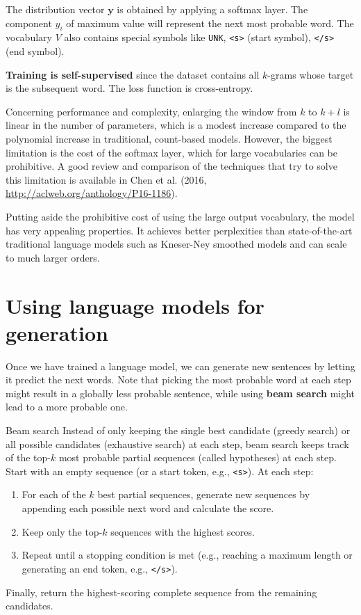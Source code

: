 The distribution vector $\mathbf{y}$ is obtained by applying a softmax layer. The component $y_{i}$ of maximum value will represent the next most probable word. The vocabulary $V$ also contains special symbols like \texttt{UNK}, \texttt{<s>} (start symbol), \texttt{</s>} (end symbol).

\textbf{Training is self-supervised} since the dataset contains all $k$-grams whose target is the subsequent word. The loss function is cross-entropy.

Concerning performance and complexity, enlarging the window from $k$ to $k+l$ is linear in the number of parameters, which is a modest increase compared to the polynomial increase in traditional, count-based models. However, the biggest limitation is the cost of the softmax layer, which for large vocabularies can be prohibitive. A good review and comparison of the techniques that try to solve this limitation is available in Chen et al. (2016, \url{http://aclweb.org/anthology/P16-1186}).

Putting aside the prohibitive cost of using the large output vocabulary, the model has very appealing properties. It achieves better perplexities than state-of-the-art traditional language models such as Kneser-Ney smoothed models and can scale to much larger orders.

\section{Using language models for generation}
Once we have trained a language model, we can generate new sentences by letting it predict the next words. Note that picking the most probable word at each step might result in a globally less probable sentence, while using \textbf{beam search} might lead to a more probable one.

\begin{observation}{Beam search}
Instead of only keeping the single best candidate (greedy search) or all possible candidates (exhaustive search) at each step, beam search keeps track of the top-$k$ most probable partial sequences (called hypotheses) at each step. Start with an empty sequence (or a start token, e.g., \texttt{<s>}). At each step:
\begin{enumerate}
    \item For each of the $k$ best partial sequences, generate new sequences by appending each possible next word and calculate the score.
    \item Keep only the top-$k$ sequences with the highest scores.
    \item Repeat until a stopping condition is met (e.g., reaching a maximum length or generating an end token, e.g., \texttt{</s>}).
\end{enumerate}
Finally, return the highest-scoring complete sequence from the remaining candidates.
\end{observation}